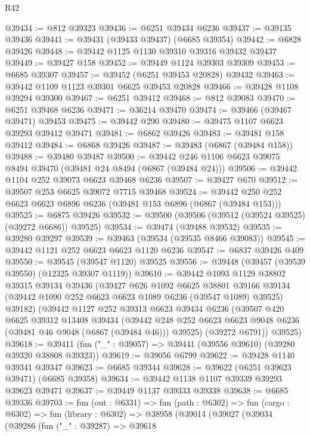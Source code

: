 \begin{lexlean}{R42}
\begin{coremodule}
{@39434 := @812 @39323
@39436 := @6251 @39434 @6236
@39437 := @39135 @39436
@39441 := @39431 (@39433 @39437) (@6685 @39354)
@39442 := @6828 @39426
@39448 := @39442 @1125 @1130 @39310 @39316 @39432 @39437
@39449 := @39427 @158
@39452 := @39449 @1124 @39303 @39309
@39453 := @6685 @39307
@39457 := @39452 (@6251 @39453 @20828) @39432
@39463 := @39442 @1109 @1123 @39301 @6625 @39453 @20828
@39466 := @39428 @1108 @39294 @39300
@39467 := @6251 @39412
@39468 := @812 @39083
@39470 := @6251 @39468 @6236
@39471 := @36214 @39470
@39474 := @39466 (@39467 @39471) @39453
@39475 := @39442 @290
@39480 := @39475 @1107 @6623 @39293 @39412 @39471
@39481 := @6862 @39426
@39483 := @39481 @158 @39412
@39484 := @6868 @39426
@39487 := @39483 (@6867 (@39484 @158))
@39488 := @39480 @39487
@39500 := @39442 @246 @1106 @6623 @39075 @8494 @39470 (@39481 @24 @8494 (@6867 (@39484 @24)))
@39506 := @39442 @1104 @252 @39073 @6623 @39468 @6236
@39507 := @39427 @670
@39512 := @39507 @253 @6625 @39072 @7715 @39468
@39524 := @39442 @250 @252 @6623 @6623 @6896 @6236 (@39481 @153 @6896 (@6867 (@39484 @153)))
@39525 := @6875 @39426
@39532 := @39500 (@39506 (@39512 (@39524 @39525) (@39272 @6686)) @39525)
@39534 := @39474 (@39488 @39532)
@39535 := @39280 @39297
@39539 := @39463 (@39534 (@39535 @8466 @39083))
@39545 := @39442 @1121 @252 @6623 @6623 @1120 @6236
@39547 := @6837 @39426 @409
@39550 := @39545 (@39547 @1120) @39525
@39556 := @39448 (@39457 (@39539 @39550) (@12325 @39307 @1119))
@39610 := @39442
    @1093
    @1129
    @38802
    @39315
    @39134
    @39436
    (@39427
      @626
      @1092
      @6625
      @38801
      @39166
      @39134
      (@39442 @1090 @252 @6623 @6623 @1089 @6236 (@39547 @1089) @39525)
      @39182)
    (@39442
      @1127
      @252
      @39313
      @6623
      @39434
      @6236
      (@39507
        @420
        @6625
        @39312
        @13408
        @39434
        (@39442 @248 @252 @6623 @6623 @9048 @6236 (@39481 @46 @9048 (@6867 (@39484 @46))) @39525)
        (@39272 @6791))
      @39525)
@39618 := @39411 (fun ("_" : @39057) => @39441 (@39556 @39610) (@39280 @39320 @38808 @39323))
@39619 := @39056 @6799
@39622 := @39428 @1140 @39341 @39347
@39623 := @6685 @39344
@39628 := @39622 (@6251 @39623 @39471) (@6685 @39358)
@39634 := @39442 @1138 @1107 @39339 @39293 @39623 @39471
@39637 := @39449 @1137 @39333 @39338
@39638 := @6685 @39336
@39703 := fun (out : @6331) =>
  fun (path : @6302) =>
  fun (cargo : @6302) =>
  fun (library : @6302) =>
  @38958
    (@39014
      (@39027
        (@39034
          (@39286
            (fun ("_" : @39287) =>
            @39618
}
\end{coremodule}
\end{lexlean}
